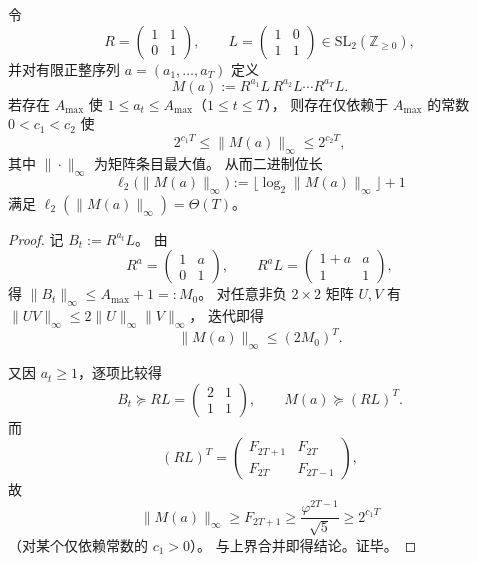 \begin{theorem}[非交换审计的线性外置证书尺度]\label{thm:xi-sl2-linear-external-certificate}
令
\[
R=
\begin{pmatrix}
1&1\\
0&1
\end{pmatrix},
\qquad
L=
\begin{pmatrix}
1&0\\
1&1
\end{pmatrix}
\in \mathrm{SL}_2(\mathbb Z_{\ge 0}),
\]
并对有限正整序列 \(a=(a_1,\dots,a_T)\) 定义
\[
M(a):=R^{a_1}L\,R^{a_2}L\cdots R^{a_T}L.
\]
若存在 \(A_{\max}\) 使 \(1\le a_t\le A_{\max}\)（\(1\le t\le T\)），
则存在仅依赖于 \(A_{\max}\) 的常数 \(0<c_1<c_2\) 使
\[
2^{c_1T}\le \|M(a)\|_\infty\le 2^{c_2T},
\]
其中 \(\|\cdot\|_\infty\) 为矩阵条目最大值。
从而二进制位长
\[
\ell_2\!\bigl(\|M(a)\|_\infty\bigr):=
\lfloor\log_2\|M(a)\|_\infty\rfloor+1
\]
满足 \(\ell_2(\|M(a)\|_\infty)=\Theta(T)\)。
\end{theorem}
\begin{proof}
记 \(B_t:=R^{a_t}L\)。
由
\[
R^a=
\begin{pmatrix}
1&a\\
0&1
\end{pmatrix},
\qquad
R^aL=
\begin{pmatrix}
1+a&a\\
1&1
\end{pmatrix},
\]
得 \(\|B_t\|_\infty\le A_{\max}+1=:M_0\)。
对任意非负 \(2\times2\) 矩阵 \(U,V\) 有
\(
\|UV\|_\infty\le 2\|U\|_\infty\|V\|_\infty
\)，
迭代即得
\[
\|M(a)\|_\infty\le (2M_0)^T.
\]

又因 \(a_t\ge 1\)，逐项比较得
\[
B_t\succeq RL=
\begin{pmatrix}
2&1\\
1&1
\end{pmatrix},
\qquad
M(a)\succeq (RL)^T.
\]
而
\[
(RL)^T=
\begin{pmatrix}
F_{2T+1}&F_{2T}\\
F_{2T}&F_{2T-1}
\end{pmatrix},
\]
故
\[
\|M(a)\|_\infty\ge F_{2T+1}
\ge \frac{\varphi^{2T-1}}{\sqrt5}
\ge 2^{c_1T}
\]
（对某个仅依赖常数的 \(c_1>0\)）。
与上界合并即得结论。证毕。
\end{proof}


